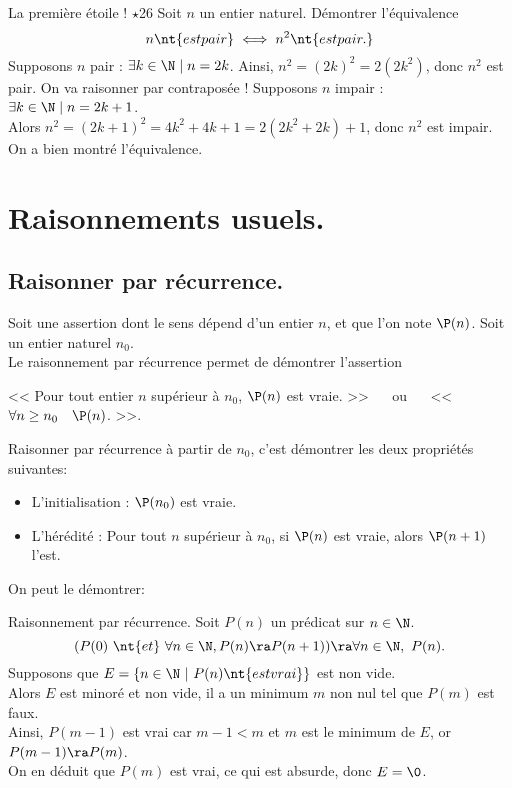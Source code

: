 \documentclass[11pt]{article}
\begin{document}
\begin{ex}{La première étoile ! $\star$}{26}
    Soit $n$ un entier naturel. Démontrer l'équivalence
    \begin{equation*}
        n \nt{ est pair} \iff n^2 \nt{ est pair.}
    \end{equation*}
    \tcblower
    \fbox{$\ra$} Supposons $n$ pair : $\exists k \in \N\mid n = 2k$. Ainsi, $n^2=(2k)^2=2(2k^2)$, donc $n^2$ est pair.\n
    \fbox{$\la$} On va raisonner par contraposée ! Supposons $n$ impair : $\exists k \in \N \mid n = 2k+1$.\\
    Alors $n^2=(2k+1)^2=4k^2+4k+1=2(2k^2+2k) + 1$, donc $n^2$ est impair.\\
    On a bien montré l'équivalence.
\end{ex}

\section{Raisonnements usuels.}

\subsection{Raisonner par récurrence.}

Soit une assertion dont le sens dépend d'un entier $n$, et que l'on note $\P(n)$. Soit un entier naturel $n_0$.\\
Le raisonnement par récurrence permet de démontrer l'assertion
\begin{center}
    << Pour tout entier $n$ supérieur à $n_0$, $\P(n)$ est vraie. >> $\quad$ ou $\quad$ << $\forall n \geq n_0 \quad \P(n)$. >>.
\end{center}

\noindent Raisonner par récurrence à partir de $n_0$, c'est démontrer les deux propriétés suivantes:
\begin{itemize}[topsep=0pt,itemsep=-0.9 ex]
    \item L'initialisation : $\P(n_0)$ est vraie.
    \item L'hérédité : Pour tout $n$ supérieur à $n_0$, si $\P(n)$ est vraie, alors $\P(n+1)$ l'est.
\end{itemize}
On peut le démontrer:
\vspace*{0.3cm}

\begin{thm}{Raisonnement par récurrence.}{}
    Soit $P(n)$ un prédicat sur $n\in\N$.
    \begin{equation*}
        (P(0) ~ \nt{et} ~ \forall n\in\N, P(n) \ra P(n+1)) \ra \forall n\in\N, ~ P(n).
    \end{equation*}
    \tcblower
    Supposons que $E=\{n\in\N ~ | ~ P(n) \nt{ est vrai}\}$ est non vide.\\
    Alors $E$ est minoré et non vide, il a un minimum $m$ non nul tel que $P(m)$ est faux.\\
    Ainsi, $P(m-1)$ est vrai car $m-1<m$ et $m$ est le minimum de $E$, or $P(m-1)\ra P(m)$.\\
    On en déduit que $P(m)$ est vrai, ce qui est absurde, donc $E=\0$.
\end{thm}
\end{document}
